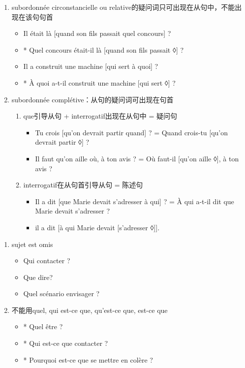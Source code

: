 \documentclass[UTF8]{report}
\begin{document}
\begin{enumerate}
    \begin{enumerate}
        \item subordonnée circonstancielle ou relative的疑问词只可出现在从句中，不能出现在该句句首
        \begin{itemize}
            \item Il était là [quand son fils passait quel concours] ?
            \item * Quel concours était-il là [quand son fils passait ◊] ?
            \item Il a construit une machine [qui sert à quoi] ?
            \item * À quoi a-t-il construit une machine [qui sert ◊] ?
        \end{itemize}
        \item subordonnée complétive：从句的疑问词可出现在句首
        \begin{enumerate}
            \item que引导从句 + interrogatif出现在从句中 = 疑问句
            \begin{itemize}
                \item Tu crois [qu’on devrait partir quand] ? = Quand crois-tu [qu’on devrait partir ◊] ?
                \item Il faut qu’on aille où, à ton avis ? = Où faut-il [qu’on aille ◊], à ton avis ?
            \end{itemize}
            \item interrogatif在从句首引导从句 = 陈述句
            \begin{itemize}
                \item Il a dit [que Marie devait s’adresser à qui] ? = À qui a-t-il dit que Marie devait s’adresser ?
                \item il a dit [à qui Marie devait [s’adresser ◊]].
            \end{itemize}
        \end{enumerate}
    \end{enumerate}
\end{enumerate}



\begin{enumerate}
    \item sujet est omis
    \begin{itemize}
        \item Qui contacter ?
        \item Que dire?
        \item Quel scénario envisager ?
    \end{itemize}
    \item 不能用quel, qui est-ce que, qu’est-ce que, est-ce que
    \begin{itemize}
        \item * Quel être ?
        \item * Qui est-ce que contacter ?
        \item * Pourquoi est-ce que se mettre en colère ?
    \end{itemize}
\end{enumerate}
\end{document}
